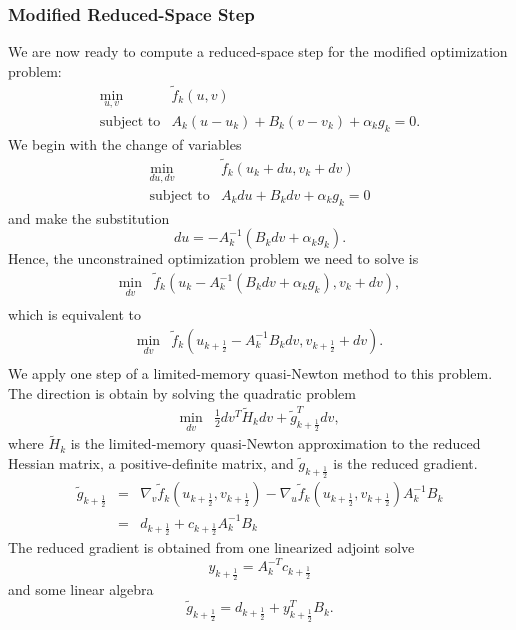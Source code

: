 \documentclass[]{book}
\begin{document}
\subsubsection{Modified Reduced-Space Step}
We are now ready to compute a reduced-space step for the modified
optimization problem:
\[
\begin{array}{ll}
\displaystyle \min_{u,v} & \tilde{f}_k(u, v) \\
\mbox{subject to} & A_k (u-u_k) + B_k (v-v_k) + \alpha_k g_k = 0.
\end{array}
\]
We begin with the change of variables
\[
\begin{array}{ll}
\displaystyle \min_{du,dv} & \tilde{f}_k(u_k+du, v_k+dv) \\
\mbox{subject to} & A_k du + B_k dv + \alpha_k g_k = 0
\end{array}
\]
and make the substitution
\[
  du = -A_k^{-1}(B_k dv + \alpha_k g_k).
\]
Hence, the unconstrained optimization problem we need to solve is
\[
\begin{array}{ll}
\displaystyle \min_{dv} & \tilde{f}_k(u_k-A_k^{-1}(B_k dv + \alpha_k g_k), v_k+dv), \\
\end{array}
\]
which is equivalent to
\[
\begin{array}{ll}
\displaystyle \min_{dv} & \tilde{f}_k(u_{k+\frac{1}{2}} - A_k^{-1} B_k dv, v_{k+\frac{1}{2}}+dv). \\
\end{array}
\]
We apply one step of a limited-memory quasi-Newton method to this
problem.  The direction is obtain by solving the quadratic problem
\[
\begin{array}{ll}
\displaystyle \min_{dv} & \frac{1}{2} dv^T \tilde{H}_k dv + \tilde{g}_{k+\frac{1}{2}}^T dv,
\end{array}
\]
where $\tilde{H}_k$ is the limited-memory quasi-Newton approximation
to the reduced Hessian matrix, a positive-definite matrix, and 
$\tilde{g}_{k+\frac{1}{2}}$ is the reduced gradient.
\[
\begin{array}{lcl}
\tilde{g}_{k+\frac{1}{2}} & = & \nabla_v \tilde{f}_k(u_{k+\frac{1}{2}}, v_{k+\frac{1}{2}}) -
	      \nabla_u \tilde{f}_k(u_{k+\frac{1}{2}}, v_{k+\frac{1}{2}}) A_k^{-1} B_k \\
	   & = & d_{k+\frac{1}{2}} + c_{k+\frac{1}{2}} A_k^{-1} B_k
\end{array}
\]
The reduced gradient is obtained from one linearized adjoint solve
\[
y_{k+\frac{1}{2}} = A_k^{-T}c_{k+\frac{1}{2}}
\]
and some linear algebra
\[
\tilde{g}_{k+\frac{1}{2}} = d_{k+\frac{1}{2}} + y_{k+\frac{1}{2}}^T B_k.
\]
\end{document}
